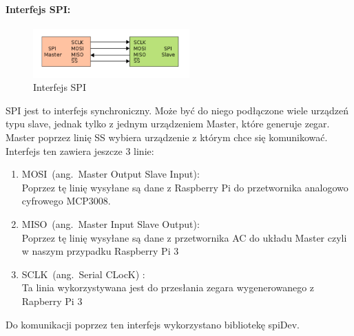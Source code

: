 \paragraph{Interfejs SPI:}
\begin{figure}[h]
	\centering
	\includegraphics[width=6cm]{SPI.png}
	\caption{Interfejs SPI}
\end{figure}
SPI jest to interfejs synchroniczny. Może być do niego podłączone wiele urządzeń typu slave, jednak tylko z jednym urządzeniem Master, które generuje zegar. Master poprzez linię SS wybiera urządzenie z którym chce się komunikować.  \\
Interfejs ten zawiera jeszcze 3 linie:
\begin{enumerate} 
\item MOSI (ang. Master Output Slave Input): \\
Poprzez tę linię wysyłane są dane z Raspberry Pi do przetwornika analogowo cyfrowego MCP3008.
\item MISO (ang. Master Input Slave Output):\\
Poprzez tę linię wysyłane są dane z przetwornika AC do układu Master czyli w naszym przypadku Raspberry Pi 3
\item SCLK (ang. Serial CLocK) :\\
Ta linia wykorzystywana jest do przesłania zegara wygenerowanego z Rapberry Pi 3
\end{enumerate}
Do komunikacji poprzez ten interfejs wykorzystano bibliotekę spiDev. \\

